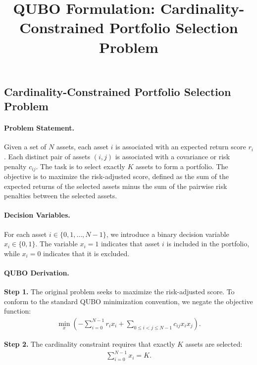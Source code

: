 \documentclass[12pt]{article}
\title{QUBO Formulation: Cardinality-Constrained Portfolio Selection Problem}
\date{}
\begin{document}
\maketitle

\subsection*{Cardinality-Constrained Portfolio Selection Problem}

\paragraph{Problem Statement.}
Given a set of $N$ assets, each asset $i$ is associated with an expected return score $r_i$. Each distinct pair of assets $(i,j)$ is associated with a covariance or risk penalty $c_{ij}$. The task is to select exactly $K$ assets to form a portfolio. The objective is to maximize the risk-adjusted score, defined as the sum of the expected returns of the selected assets minus the sum of the pairwise risk penalties between the selected assets.

\paragraph{Decision Variables.}
For each asset $i \in \{0, 1, \dots, N-1\}$, we introduce a binary decision variable $x_i \in \{0,1\}$. The variable $x_i = 1$ indicates that asset $i$ is included in the portfolio, while $x_i = 0$ indicates that it is excluded.

\paragraph{QUBO Derivation.}
\textbf{Step 1.} The original problem seeks to maximize the risk-adjusted score. To conform to the standard QUBO minimization convention, we negate the objective function:
\begin{align}
  \min_{x} \left( -\sum_{i=0}^{N-1} r_i x_i + \sum_{0 \le i < j \le N-1} c_{ij} x_i x_j \right).
\end{align}

\textbf{Step 2.} The cardinality constraint requires that exactly $K$ assets are selected:
\begin{align}
  \sum_{i=0}^{N-1} x_i = K.
\end{align}
\end{document}
